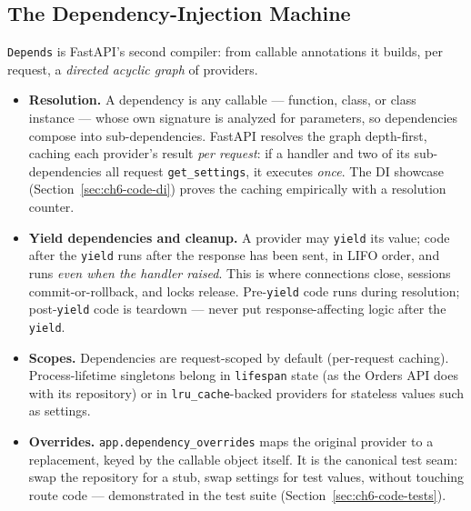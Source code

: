 \subsection{The Dependency-Injection Machine}
\label{sec:ch6-di}

\texttt{Depends} is FastAPI's second compiler: from callable annotations it
builds, per request, a \emph{directed acyclic graph} of providers.

\begin{itemize}
  \item \textbf{Resolution.} A dependency is any callable --- function,
        class, or class instance --- whose own signature is analyzed for
        parameters, so dependencies compose into sub-dependencies. FastAPI
        resolves the graph depth-first, caching each provider's result
        \emph{per request}: if a handler and two of its sub-dependencies all
        request \texttt{get\_settings}, it executes \emph{once}. The DI
        showcase (Section~\ref{sec:ch6-code-di}) proves the caching
        empirically with a resolution counter.
  \item \textbf{Yield dependencies and cleanup.} A provider may
        \texttt{yield} its value; code after the \texttt{yield} runs after
        the response has been sent, in LIFO order, and runs \emph{even when
        the handler raised}. This is where connections close, sessions
        commit-or-rollback, and locks release. Pre-\texttt{yield} code runs
        during resolution; post-\texttt{yield} code is teardown --- never put
        response-affecting logic after the \texttt{yield}.
  \item \textbf{Scopes.} Dependencies are request-scoped by default
        (per-request caching). Process-lifetime singletons belong in
        \texttt{lifespan} state (as the Orders API does with its repository)
        or in \texttt{lru\_cache}-backed providers for stateless values such
        as settings.
  \item \textbf{Overrides.} \texttt{app.dependency\_overrides} maps the
        original provider to a replacement, keyed by the callable object
        itself. It is the canonical test seam: swap the repository for a
        stub, swap settings for test values, without touching route code ---
        demonstrated in the test suite (Section~\ref{sec:ch6-code-tests}).
\end{itemize}

